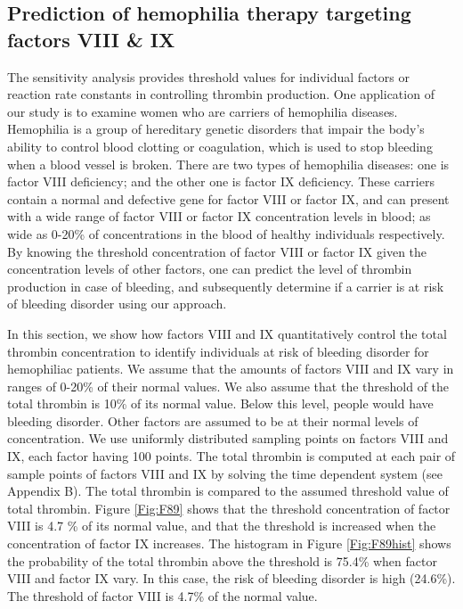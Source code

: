 \subsection*{Prediction of hemophilia therapy targeting factors VIII \& IX}
The sensitivity analysis provides threshold values for individual
factors or reaction rate constants in controlling thrombin
production. One application of our study is to examine women who are
carriers of hemophilia diseases. Hemophilia is a group of hereditary genetic
disorders that impair the body's ability to control blood clotting
or coagulation, which is used to stop bleeding when a blood vessel
is broken. There are two types of hemophilia diseases: one is factor
VIII deficiency; and the other one is factor IX deficiency. These
carriers contain a normal and defective gene for factor VIII or
factor IX, and can present with a wide range of factor VIII or
factor IX concentration levels in blood; as wide as 0-20\% of
 concentrations in the blood of healthy individuals respectively. By knowing the threshold concentration
of factor VIII or factor IX given the concentration levels of other
factors, one can predict the level of thrombin production in case of
bleeding, and subsequently determine if a carrier is at risk of
bleeding disorder using our approach.

In this section, we show how factors VIII and IX quantitatively
control the total thrombin concentration to identify individuals at
risk of bleeding disorder for hemophiliac patients. We assume that
the amounts of factors VIII and IX vary in ranges of 0-20\% of their
normal values. We also assume that the threshold of the total
thrombin is 10\% of its normal value. Below this level, people would
have bleeding disorder. Other factors are assumed to be at their
normal levels of concentration. We use uniformly distributed
sampling points on factors VIII and IX, each factor having 100
points. The total thrombin is computed at each pair of sample points
of factors VIII and IX by solving the time dependent system (see
Appendix B). The total thrombin is compared to the assumed threshold
value of total thrombin. Figure \ref{Fig:F89} shows that the
threshold concentration of factor VIII is 4.7 \% of its normal
value, and that the threshold is increased when the concentration of
factor IX increases. The histogram in Figure \ref{Fig:F89hist} shows
the probability of the total thrombin above the threshold is 75.4\%
when factor VIII and factor IX vary. In this case, the risk of
bleeding disorder is high (24.6\%). The threshold of factor VIII is
4.7\% of the normal value.



